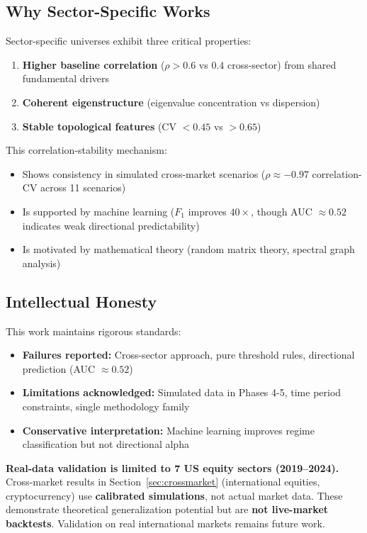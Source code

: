 \documentclass[12pt,letterpaper]{article}
\begin{document}
\subsection*{Why Sector-Specific Works}

Sector-specific universes exhibit three critical properties:
\begin{enumerate}
    \item \textbf{Higher baseline correlation} ($\rho > 0.6$ vs $0.4$ cross-sector) from shared fundamental drivers
    \item \textbf{Coherent eigenstructure} (eigenvalue concentration vs dispersion)
    \item \textbf{Stable topological features} (CV $< 0.45$ vs $> 0.65$)
\end{enumerate}

This correlation-stability mechanism:
\begin{itemize}
    \item Shows consistency in simulated cross-market scenarios ($\rho \approx -0.97$ correlation-CV across 11 scenarios)
    \item Is supported by machine learning ($F_1$ improves $40\times$, though AUC $\approx 0.52$ indicates weak directional predictability)
    \item Is motivated by mathematical theory (random matrix theory, spectral graph analysis)
\end{itemize}

\subsection*{Intellectual Honesty}

This work maintains rigorous standards:
\begin{itemize}
    \item \textbf{Failures reported:} Cross-sector approach, pure threshold rules, directional prediction (AUC $\approx 0.52$)
    \item \textbf{Limitations acknowledged:} Simulated data in Phases 4-5, time period constraints, single methodology family
    \item \textbf{Conservative interpretation:} Machine learning improves regime classification but not directional alpha
\end{itemize}

\begin{tcolorbox}[colback=yellow!10, colframe=orange!80, title=\textbf{Data Limitation}]
\textbf{Real-data validation is limited to 7 US equity sectors (2019--2024).} Cross-market results in Section~\ref{sec:crossmarket} (international equities, cryptocurrency) use \textbf{calibrated simulations}, not actual market data. These demonstrate theoretical generalization potential but are \textbf{not live-market backtests}. Validation on real international markets remains future work.
\end{tcolorbox}
\end{document}
